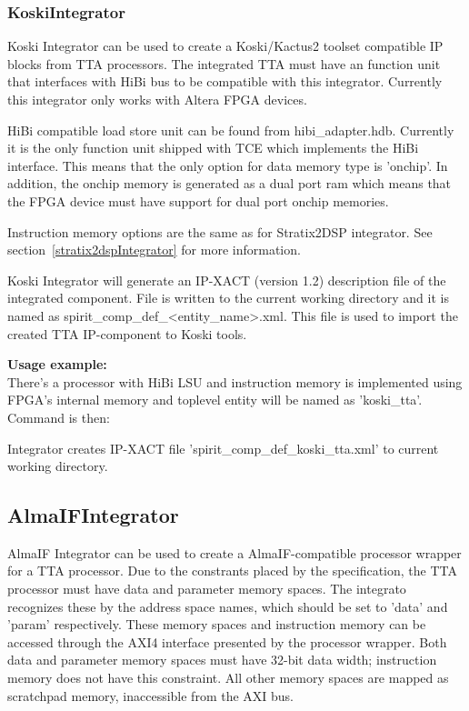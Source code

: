 \documentclass[twoside]{tceusermanual}
\begin{document}
\subsubsection{KoskiIntegrator}

Koski Integrator can be used to create a Koski/Kactus2 toolset
compatible IP blocks from TTA processors. The integrated TTA must have
an function unit that interfaces with HiBi bus to be compatible with
this integrator. Currently this integrator only works with Altera
FPGA devices.

HiBi compatible load store unit can be found from hibi\_adapter.hdb. Currently
it is the only function unit shipped with TCE which implements the HiBi interface.
This means that the only option for data memory type is 'onchip'. In addition,
the onchip memory is generated as a dual port ram which means that the FPGA
device must have support for dual port onchip memories.

Instruction memory options are the same as for Stratix2DSP integrator. See
section~\ref{stratix2dspIntegrator} for more information.

Koski Integrator will generate an IP-XACT (version 1.2) description file of the
integrated component. File is written to the current working directory and it
is named as spirit\_comp\_def\_<entity\_name>.xml. This file is used to import
the created TTA IP-component to Koski tools.

\textbf{Usage example:} \\
There's a processor with HiBi LSU and instruction memory is implemented using
FPGA's internal memory and toplevel entity will be named as 'koski\_tta'.
Command is then:


Integrator creates IP-XACT file 'spirit\_comp\_def\_koski\_tta.xml' to
current working directory.

\subsection{AlmaIFIntegrator}

AlmaIF Integrator can be used to create a AlmaIF-compatible
processor wrapper for a TTA processor. Due to the constrants placed by the
specification, the TTA processor must have data and parameter memory spaces.
The integrato recognizes these by the address space names, which should be set
to 'data' and 'param' respectively. These memory spaces and instruction
memory can be accessed through the AXI4 interface presented by the processor
wrapper. Both data and parameter memory spaces must have 32-bit data width;
instruction memory does not have this constraint. All other memory spaces are 
mapped as scratchpad memory, inaccessible from the AXI bus.
\end{document}
